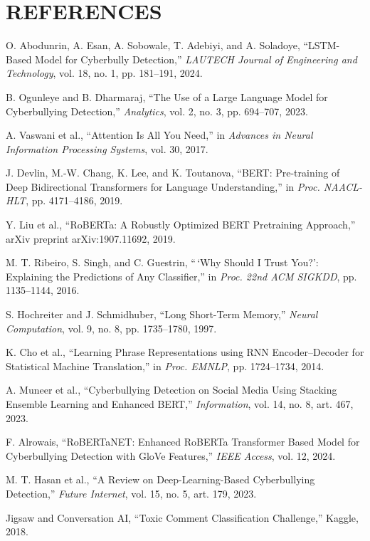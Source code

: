 \documentclass[12pt,a4paper]{article}
\begin{document}
\section{REFERENCES}
\begin{enumerate}[label={[\arabic*]}, leftmargin=2em]
\item O. Abodunrin, A. Esan, A. Sobowale, T. Adebiyi, and A. Soladoye, ``LSTM-Based Model for Cyberbully Detection,'' \emph{LAUTECH Journal of Engineering and Technology}, vol. 18, no. 1, pp. 181--191, 2024.
\item B. Ogunleye and B. Dharmaraj, ``The Use of a Large Language Model for Cyberbullying Detection,'' \emph{Analytics}, vol. 2, no. 3, pp. 694--707, 2023.
\item A. Vaswani et al., ``Attention Is All You Need,'' in \emph{Advances in Neural Information Processing Systems}, vol. 30, 2017.
\item J. Devlin, M.-W. Chang, K. Lee, and K. Toutanova, ``BERT: Pre-training of Deep Bidirectional Transformers for Language Understanding,'' in \emph{Proc. NAACL-HLT}, pp. 4171--4186, 2019.
\item Y. Liu et al., ``RoBERTa: A Robustly Optimized BERT Pretraining Approach,'' arXiv preprint arXiv:1907.11692, 2019.
\item M. T. Ribeiro, S. Singh, and C. Guestrin, ``\,`Why Should I Trust You?': Explaining the Predictions of Any Classifier,'' in \emph{Proc. 22nd ACM SIGKDD}, pp. 1135--1144, 2016.
\item S. Hochreiter and J. Schmidhuber, ``Long Short-Term Memory,'' \emph{Neural Computation}, vol. 9, no. 8, pp. 1735--1780, 1997.
\item K. Cho et al., ``Learning Phrase Representations using RNN Encoder--Decoder for Statistical Machine Translation,'' in \emph{Proc. EMNLP}, pp. 1724--1734, 2014.
\item A. Muneer et al., ``Cyberbullying Detection on Social Media Using Stacking Ensemble Learning and Enhanced BERT,'' \emph{Information}, vol. 14, no. 8, art. 467, 2023.
\item F. Alrowais, ``RoBERTaNET: Enhanced RoBERTa Transformer Based Model for Cyberbullying Detection with GloVe Features,'' \emph{IEEE Access}, vol. 12, 2024.
\item M. T. Hasan et al., ``A Review on Deep-Learning-Based Cyberbullying Detection,'' \emph{Future Internet}, vol. 15, no. 5, art. 179, 2023.
\item Jigsaw and Conversation AI, ``Toxic Comment Classification Challenge,'' Kaggle, 2018.
\end{enumerate}
\end{document}
